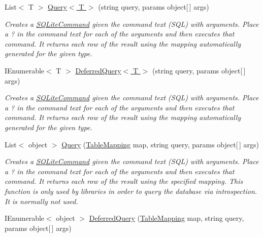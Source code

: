 \begin{DoxyCompactItemize}
\item 
List$<$ T $>$ \hyperlink{classSQLite_1_1SQLiteConnection_ade363948abe65a6b97fe8574f943db91}{Query$<$ T $>$} (string query, params object\mbox{[}$\,$\mbox{]} args)
\begin{DoxyCompactList}\small\item\em Creates a \hyperlink{classSQLite_1_1SQLiteCommand}{S\+Q\+Lite\+Command} given the command text (S\+Q\+L) with arguments. Place a \textquotesingle{}?\textquotesingle{} in the command text for each of the arguments and then executes that command. It returns each row of the result using the mapping automatically generated for the given type. \end{DoxyCompactList}\item 
I\+Enumerable$<$ T $>$ \hyperlink{classSQLite_1_1SQLiteConnection_a334b139ead4620ad13b5e1d54e8077af}{Deferred\+Query$<$ T $>$} (string query, params object\mbox{[}$\,$\mbox{]} args)
\begin{DoxyCompactList}\small\item\em Creates a \hyperlink{classSQLite_1_1SQLiteCommand}{S\+Q\+Lite\+Command} given the command text (S\+Q\+L) with arguments. Place a \textquotesingle{}?\textquotesingle{} in the command text for each of the arguments and then executes that command. It returns each row of the result using the mapping automatically generated for the given type. \end{DoxyCompactList}\item 
List$<$ object $>$ \hyperlink{classSQLite_1_1SQLiteConnection_aeac8a5ef1be5cfabc5bbf33f1fec01b0}{Query} (\hyperlink{classSQLite_1_1TableMapping}{Table\+Mapping} map, string query, params object\mbox{[}$\,$\mbox{]} args)
\begin{DoxyCompactList}\small\item\em Creates a \hyperlink{classSQLite_1_1SQLiteCommand}{S\+Q\+Lite\+Command} given the command text (S\+Q\+L) with arguments. Place a \textquotesingle{}?\textquotesingle{} in the command text for each of the arguments and then executes that command. It returns each row of the result using the specified mapping. This function is only used by libraries in order to query the database via introspection. It is normally not used. \end{DoxyCompactList}\item 
I\+Enumerable$<$ object $>$ \hyperlink{classSQLite_1_1SQLiteConnection_ab359d97e7938a573e0a565d2c46aa401}{Deferred\+Query} (\hyperlink{classSQLite_1_1TableMapping}{Table\+Mapping} map, string query, params object\mbox{[}$\,$\mbox{]} args)

\end{DoxyCompactItemize}
